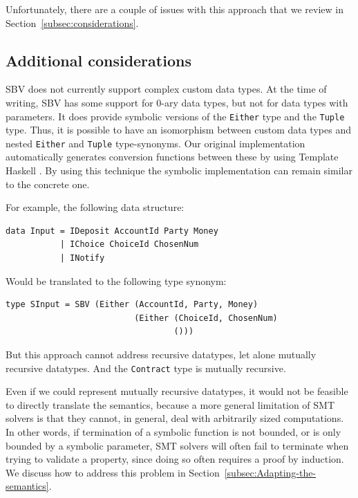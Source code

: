 \documentclass[english,runningheads]{llncs}
\begin{document}
Unfortunately, there are a couple of issues with this approach that
we review in Section~\ref{subsec:considerations}.

\subsection{Additional considerations\label{subsec:considerations}}

SBV does not currently support complex custom data types. At the time
of writing, SBV has some support for 0-ary data types, but not for
data types with parameters.
It does provide symbolic versions of the \texttt{Either} type and the \texttt{Tuple} type.
Thus, it is possible to have an isomorphism between custom data types and
nested \texttt{Either} and \texttt{Tuple} type-synonyms. Our original
implementation automatically generates conversion functions between these
by using Template Haskell \cite{sheard2002template}. By using this technique the symbolic
implementation can remain similar to the concrete one.

For example, the following data structure:

\begin{verbatim}
data Input = IDeposit AccountId Party Money
           | IChoice ChoiceId ChosenNum
           | INotify
\end{verbatim}

Would be translated to the following type synonym:

\begin{verbatim}
type SInput = SBV (Either (AccountId, Party, Money)
                          (Either (ChoiceId, ChosenNum)
                                  ()))
\end{verbatim}

But this approach cannot address recursive datatypes, let alone mutually
recursive datatypes. And the \texttt{Contract} type is mutually recursive.

Even if we could represent mutually recursive datatypes, it would
not be feasible to directly translate the semantics, because a more
general limitation of SMT solvers is that they cannot, in general,
deal with arbitrarily sized computations. In other words, if termination
of a symbolic function is not bounded, or is only bounded by a symbolic
parameter, SMT solvers will often fail to terminate when trying to validate
a property, since doing so often requires a proof by induction. We
discuss how to address this problem in Section~\ref{subsec:Adapting-the-semantics}.
\end{document}
